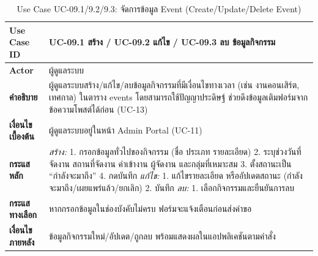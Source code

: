 \begin{table}[H]
\centering
\caption{Use Case UC-09.1/9.2/9.3: จัดการข้อมูล Event (Create/Update/Delete Event)}
\label{tab:uc09x}
\begin{tabular}{|p{3.2cm}|p{10cm}|}
\hline
\textbf{Use Case ID} & UC-09.1 สร้าง / UC-09.2 แก้ไข / UC-09.3 ลบ ข้อมูลกิจกรรม \\ \hline
\textbf{Actor} & ผู้ดูแลระบบ \\ \hline
\textbf{คำอธิบาย} & ผู้ดูแลระบบสร้าง/แก้ไข/ลบข้อมูลกิจกรรมที่มีเงื่อนไขทางเวลา (เช่น งานคอนเสิร์ต, เทศกาล) ในตาราง events โดยสามารถใช้ปัญญาประดิษฐ์ ช่วยดึงข้อมูลเติมฟอร์มจากข้อความโพสต์ได้ก่อน (UC-13) \\ \hline
\textbf{เงื่อนไขเบื้องต้น} & ผู้ดูแลระบบอยู่ในหน้า Admin Portal (UC-11) \\ \hline
\textbf{กระแสหลัก} & \textit{สร้าง:} 1. กรอกข้อมูลทั่วไปของกิจกรรม (ชื่อ ประเภท รายละเอียด) 2. ระบุช่วงวันที่จัดงาน สถานที่จัดงาน ค่าเข้างาน ผู้จัดงาน และกลุ่มที่เหมาะสม 3. ตั้งสถานะเป็น ``กำลังจะมาถึง'' 4. กดบันทึก \newline \textit{แก้ไข:} 1. แก้ไขรายละเอียด หรืออัปเดตสถานะ (กำลังจะมาถึง/เผยแพร่แล้ว/ยกเลิก) 2. บันทึก \newline \textit{ลบ:} 1. เลือกกิจกรรมและยืนยันการลบ \\ \hline
\textbf{กระแสทางเลือก} & หากกรอกข้อมูลในช่องบังคับไม่ครบ ฟอร์มจะแจ้งเตือนก่อนส่งคำขอ \\ \hline
\textbf{เงื่อนไขภายหลัง} & ข้อมูลกิจกรรมใหม่/อัปเดต/ถูกลบ พร้อมแสดงผลในแอปพลิเคชันตามคำสั่ง \\
\hline
\end{tabular}
\end{table}

